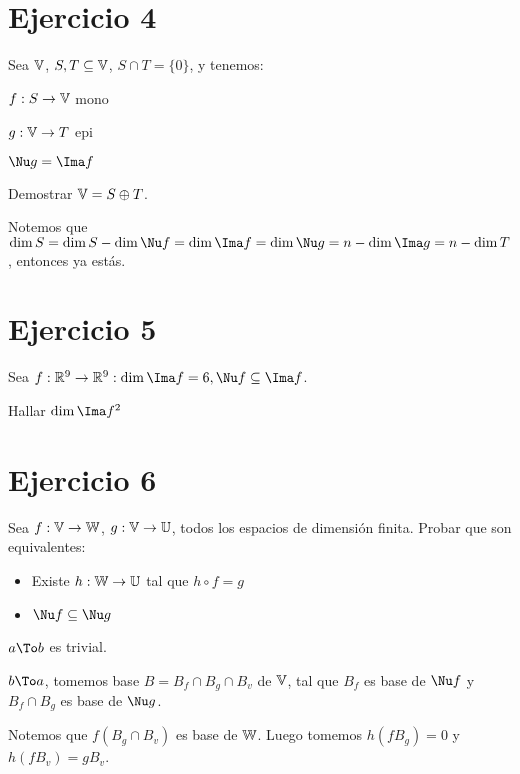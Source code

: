 \documentclass{article}
\begin{document}
\section{Ejercicio 4}
Sea $\mathbb{V}$, $S, T \subseteq \mathbb{V}$, $S\cap T = \{0\}$, y tenemos:

$f : S \to \mathbb{V}$ mono

$g : \mathbb{V} \to T$ epi

$\Nu g = \Ima f$

Demostrar $\mathbb{V} = S \oplus T$.

Notemos que $\dim S = \dim S - \dim \Nu f = \dim \Ima f = \dim \Nu g =
n - \dim \Ima g = n - \dim T$, entonces ya estás.

\section{Ejercicio 5}
Sea $f : \R^9 \to \R^9 : \dim \Ima f = 6, \Nu f \inn \Ima f$.

Hallar $\dim \Ima f^2$

\section{Ejercicio 6}
Sea $f : \mathbb{V} \to \mathbb{W}$, $g : \mathbb{V} \to \mathbb{U}$, todos los espacios de dimensión finita.
Probar que son equivalentes:
\begin{itemize}
	\item Existe $h : \mathbb{W} \to \mathbb{U}$ tal que $h \circ f = g$
	\item $\Nu f \inn \Nu g$
\end{itemize}

$a \To b$ es trivial.

$b \To a$, tomemos base $B = B_f \cap B_g \cap B_v$ de $\mathbb{V}$, tal que $B_f$ es
base de $\Nu f$ y $B_f \cap B_g$ es base de $\Nu g$.

Notemos que $f (B_g \cap B_v)$ es base de $\mathbb{W}$. Luego tomemos $h(fB_g) = 0$ y
$h(fB_v) = gB_v$.
\end{document}
